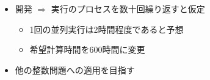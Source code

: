\documentclass[headrule,footrule,landscape,a4paper,25pt]{foils}
\begin{document}
 \begin{itemize}
  \item 開発 $\Rightarrow$ 実行のプロセスを数十回繰り返すと仮定
  \begin{itemize}
   \item 1回の並列実行は2時間程度であると予想
   \item 希望計算時間を600時間に変更
  \end{itemize}
  \item 他の整数問題への適用を目指す
 \end{itemize}
\end{document}
